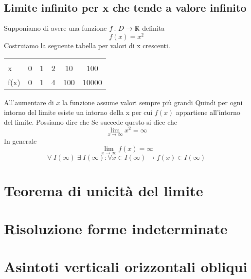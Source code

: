 \section{Limite infinito per x che tende a valore infinito}
Supponiamo di avere una funzione $f\colon D\to{}\mathbb{R}$ definita \[f(x)=x^2\] 
Costruiamo la seguente tabella per valori di x crescenti.
\begin{center}
	\begin{tabular}{@{}L*{5}{c}}
		\toprule
		&&&\\
		x& 0 & 1 &2&10&100\\
		\cmidrule(r){2-6} 
		f(x)	&0&1&4&100&10000\\
		\bottomrule
	\end{tabular}
\end{center}
All'aumentare di $x$ la funzione assume valori sempre più grandi
Quindi per ogni intorno del limite esiste un intorno della x per cui $f(x)$ appartiene all'intorno del limite. Possiamo dire che  Se succede questo si dice che \[\lim_{x\to \infty}x^2=\infty \]
In generale \begin{equation*}
\lim_{x\to \infty}f(x)=\infty
\end{equation*}
\begin{equation*}
\forall\; I(\infty)\; \exists\; I(\infty) : \forall x\in I(\infty) \longrightarrow f(x)\in I(\infty)
\end{equation*}
 \chapter{Teorema di unicità del limite}
 \chapter{Risoluzione forme indeterminate}
 \chapter{Asintoti verticali orizzontali obliqui}